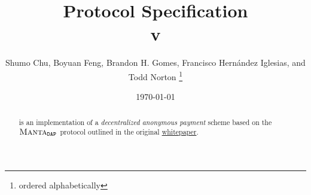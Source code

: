 \documentclass{article}
\title{\textbf{\MantaPay{} Protocol Specification}\\ v}
\author{Shumo Chu, Boyuan Feng, Brandon H. Gomes, Francisco Hernández Iglesias, and Todd Norton \thanks{ordered alphabetically}}
\date{\today}
\begin{document}
    
\maketitle

\begin{abstract}
    \MantaPay{} is an implementation of a \emph{decentralized anonymous payment} scheme based on the ${{\textsc{Manta}}{}_{\texttt{DAP}}}$ protocol outlined in the original \href{https://eprint.iacr.org/2021/743.pdf}{\Manta{} whitepaper}.
\end{abstract}
    
\tableofcontents
\newpage











\end{document}
